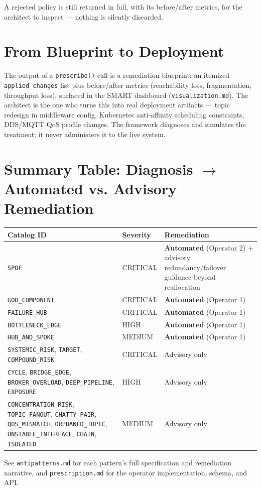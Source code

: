 \documentclass[11pt]{article}
\begin{document}
A rejected policy is still returned in full, with its before/after metrics, for the architect to inspect --- nothing is silently discarded.

\section{From Blueprint to Deployment}

The output of a \texttt{prescribe()} call is a remediation blueprint: an itemized \texttt{applied\_changes} list plus before/after metrics (reachability loss, fragmentation, throughput loss), surfaced in the SMART dashboard (\texttt{visualization.md}). The architect is the one who turns this into real deployment artifacts --- topic redesign in middleware config, Kubernetes anti-affinity scheduling constraints, DDS/MQTT QoS profile changes. The framework diagnoses and simulates the treatment; it never administers it to the live system.

\section{Summary Table: Diagnosis $\to$ Automated vs. Advisory Remediation}

\begin{center}
\begin{tabular}{@{}p{3.6cm}lp{6.5cm}@{}}
\toprule
\textbf{Catalog ID} & \textbf{Severity} & \textbf{Remediation} \\
\midrule
\texttt{SPOF} & CRITICAL & \textbf{Automated} (Operator 2) + advisory redundancy/failover guidance beyond reallocation \\
\texttt{GOD\_COMPONENT} & CRITICAL & \textbf{Automated} (Operator 1) \\
\texttt{FAILURE\_HUB} & CRITICAL & \textbf{Automated} (Operator 1) \\
\texttt{BOTTLENECK\_EDGE} & HIGH & \textbf{Automated} (Operator 1) \\
\texttt{HUB\_AND\_SPOKE} & MEDIUM & \textbf{Automated} (Operator 1) \\
\texttt{SYSTEMIC\_RISK}, \texttt{TARGET}, \texttt{COMPOUND\_RISK} & CRITICAL & Advisory only \\
\texttt{CYCLE}, \texttt{BRIDGE\_EDGE}, \texttt{BROKER\_OVERLOAD}, \texttt{DEEP\_PIPELINE}, \texttt{EXPOSURE} & HIGH & Advisory only \\
\texttt{CONCENTRATION\_RISK}, \texttt{TOPIC\_FANOUT}, \texttt{CHATTY\_PAIR}, \texttt{QOS\_MISMATCH}, \texttt{ORPHANED\_TOPIC}, \texttt{UNSTABLE\_INTERFACE}, \texttt{CHAIN}, \texttt{ISOLATED} & MEDIUM & Advisory only \\
\bottomrule
\end{tabular}
\end{center}

\noindent See \texttt{antipatterns.md} for each pattern's full specification and remediation narrative, and \texttt{prescription.md} for the operator implementation, schema, and API.
\end{document}
